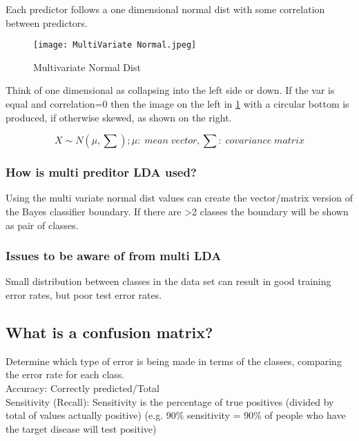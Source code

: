\documentclass[11pt]{scrartcl} %
\begin{document}
Each predictor follows a one dimensional normal dist with some correlation between predictors.

\begin{figure}[h] %
	\centering
	\texttt{[image: MultiVariate Normal.jpeg]} %
	\caption{Multivariate Normal Dist}
	\label{multi-normal}
\end{figure}

Think of one dimensional as collapsing into the left side or down. If the var is equal and correlation=0
then the image on the left in \ref{multi-normal} with a circular bottom is produced, if otherwise skewed,
as shown on the right.

\begin{equation}
	X \sim N(\mu,\sum); \mu:\; mean\; vector, \sum:\; covariance\; matrix
\end{equation}

\subsubsection{How is multi preditor LDA used?}

Using the multi variate normal dist values can create the vector/matrix version of the Bayes 
classifier boundary. If there are >2 classes the boundary will be shown as pair of classes.

\subsubsection{Issues to be aware of from multi LDA}

Small distribution between classes in the data set can result in good training error rates, but 
poor test error rates.

\subsection{What is a confusion matrix?}

Determine which type of error is being made in terms of the classes, comparing the error rate for
each class.\\

Accuracy: Correctly predicted/Total \\

Sensitivity (Recall): Sensitivity is the percentage of true positives (divided by total of values actually positive) (e.g. 90\% sensitivity = 90\% of people who have the target disease will test positive)\\
\end{document}
